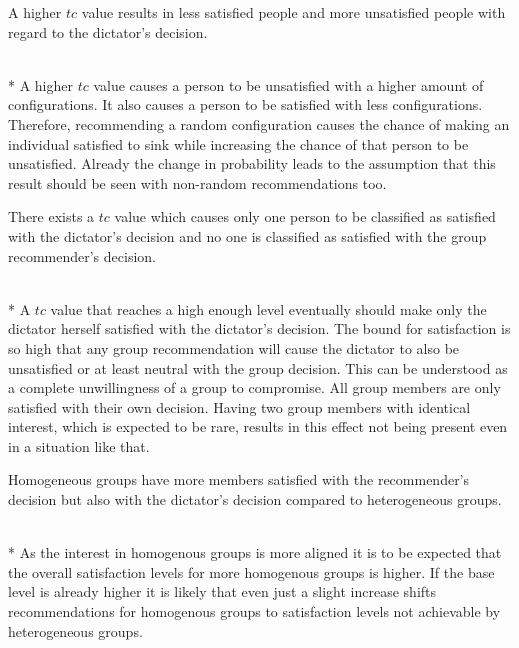 \begin{hypothesis}
    \begin{itshape}
        \label{hyp:Evaluation:HigherTcLessSatisfied} A higher $tc$ value results in less satisfied people and more unsatisfied people with regard to the dictator's decision.
    \end{itshape} \medskip \\*
    A higher $tc$ value causes a person to be unsatisfied with a higher amount of configurations. It also causes a person to be satisfied with less configurations. Therefore, recommending a random configuration causes the chance of making an individual satisfied to sink while increasing the chance of that person to be unsatisfied. Already the change in probability leads to the assumption that this result should be seen with non-random recommendations too.
\end{hypothesis}

\begin{hypothesis}
    \begin{itshape}
        \label{hyp:Evaluation:OnlyOneSatisfied} There exists a $tc$ value which causes only one person to be classified as satisfied with the dictator's decision and no one is classified as satisfied with the group recommender's decision.
    \end{itshape} \medskip \\*
    A $tc$ value that reaches a high enough level eventually should make only the dictator herself satisfied with the dictator's decision. The bound for satisfaction is so high that any group recommendation will cause the dictator to also be unsatisfied or at least neutral with the group decision. This can be understood as a complete unwillingness of a group to compromise. All group members are only satisfied with their own decision. Having two group members with identical interest, which is expected to be rare, results in this effect not being present even in a situation like that. 
\end{hypothesis}

\begin{hypothesis}
    \begin{itshape}
        \label{hyp:Evaluation:HomogenousMoreSatisfied} Homogeneous groups have more members satisfied with the recommender's decision but also with the dictator's decision compared to heterogeneous groups.
    \end{itshape} \medskip \\*
    As the interest in homogenous groups is more aligned it is to be expected that the overall satisfaction levels for more homogenous groups is higher. If the base level is already higher it is likely that even just a slight increase shifts recommendations for homogenous groups to satisfaction levels not achievable by heterogeneous groups.
\end{hypothesis}

